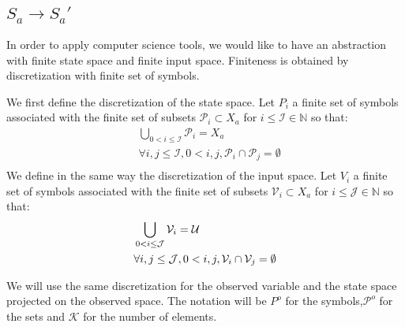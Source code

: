 \subsection{$S_a \rightarrow S_a'$}
In order to apply computer science tools, we would like to have an abstraction with finite state space and finite input space.
Finiteness is obtained by discretization with finite set of symbols.

\newcommand{\symbD}{P}
\newcommand{\setD}{\mathcal{P}}
\newcommand{\sizeD}{\mathcal{I}}
We first define the discretization of the state space.
Let $\symbD_i$ a finite set of symbols associated with the finite set of subsets $\setD_i \subset X_a$ for $i \leq \sizeD \in \mathbb{N}$ so that:
\begin{equation}
\begin{split}
&\bigcup_{0 < i \leq \sizeD} \setD_i = X_a \\
&\forall i,j \leq \sizeD,0 < i,j, \setD_i \cap \setD_j = \emptyset\\
\end{split}
\end{equation}
\newcommand{\symbU}{V}
\newcommand{\setU}{\mathcal{V}}
\newcommand{\sizeU}{\mathcal{J}}
We define in the same way the discretization of the input space. 
Let $\symbU_i$ a finite set of symbols associated with the finite set of subsets $\setU_i \subset X_a$ for $i \leq \sizeU \in \mathbb{N}$ so that:
\begin{equation}
\begin{split}
&\bigcup_{0 < i \leq \sizeU} \setU_i = \U \\
&\forall i,j \leq \sizeU,0 < i,j, \setU_i \cap \setU_j = \emptyset\\
\end{split}
\end{equation}

\newcommand{\symbO}{P^o}
\newcommand{\setO}{\mathcal{P}^o}
\newcommand{\sizeO}{\mathcal{K}}
We will use the same discretization for the observed variable and the state space projected on the observed space. The notation will be $\symbO$ for the symbols,$\setO$ for the sets and $\sizeO$ for the number of elements.

